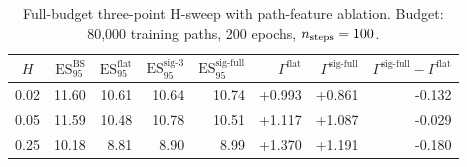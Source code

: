 \begin{table}[h]
\centering
\caption{Full-budget three-point H-sweep with path-feature ablation.
         Budget: 80{,}000 training paths, 200 epochs, $n_{\rm steps}=100$.}
\label{tab:lean_h4}
\begin{tabular}{c|rrrr|rrr}
\hline
$H$ & $\mathrm{ES}_{95}^{\text{BS}}$ & $\mathrm{ES}_{95}^{\text{flat}}$ & $\mathrm{ES}_{95}^{\text{sig-3}}$ & $\mathrm{ES}_{95}^{\text{sig-full}}$ & $\Gamma^{\text{flat}}$ & $\Gamma^{\text{sig-full}}$ & $\Gamma^{\text{sig-full}}-\Gamma^{\text{flat}}$ \\
\hline
0.02 & 11.60 & 10.61 & 10.64 & 10.74 & +0.993 & +0.861 & -0.132 \\
0.05 & 11.59 & 10.48 & 10.78 & 10.51 & +1.117 & +1.087 & -0.029 \\
0.25 & 10.18 & 8.81 & 8.90 & 8.99 & +1.370 & +1.191 & -0.180 \\
\hline
\end{tabular}
\end{table}